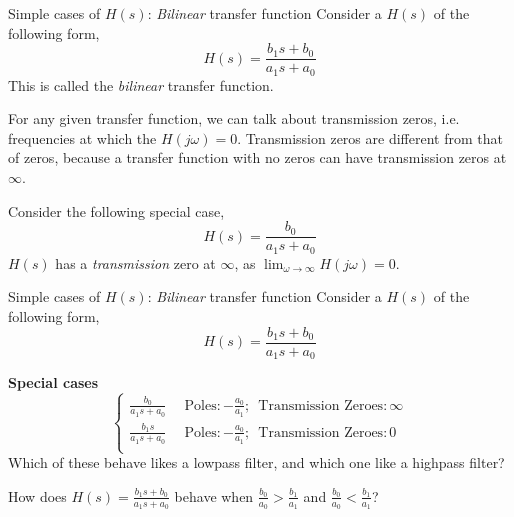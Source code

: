 \documentclass{beamer}
\begin{document}
\begin{frame}{Simple cases of $H(s)$: \textit{Bilinear} transfer function}
Consider a $H(s)$ of the following form,
\[ H(s) = \frac{b_1s + b_0}{a_1s + a_0} \]
This is called the \textit{bilinear} transfer function.\\
\vspace{2mm}

For any given transfer function, we can talk about transmission zeros, i.e. frequencies at which the $H(j\omega) = 0$. Transmission zeros are different from that of zeros, because a transfer function with no zeros can have transmission zeros at $\infty$.\\
\vspace{2mm}

Consider the following special case,
\[ H(s) = \frac{b_0}{a_1s + a_0} \]
$H(s)$ has a \textit{transmission} zero at $\infty$, as $\lim_{\omega \to \infty}H(j\omega) = 0$. 
\end{frame}

\begin{frame}{Simple cases of $H(s)$: \textit{Bilinear} transfer function}
Consider a $H(s)$ of the following form,
\[ H(s) = \frac{b_1s + b_0}{a_1s + a_0} \]

\textbf{Special cases}
\[\begin{cases}
\frac{b_0}{a_1s+a_0} & \,\,\,\text{Poles}: -\frac{a_0}{a_1};\,\,\,\text{Transmission Zeroes}: \infty \\
\frac{b_1s}{a_1s+a_0} & \,\,\,\text{Poles}: -\frac{a_0}{a_1};\,\,\,\text{Transmission Zeroes}: 0 \\
\end{cases}
\]
Which of these behave likes a lowpass filter, and which one like a highpass filter?\\
\vspace{2mm}

How does $H(s) = \frac{b_1s + b_0}{a_1s + a_0}$ behave when $\frac{b_0}{a_0} > \frac{b_1}{a_1}$ and $\frac{b_0}{a_0} < \frac{b_1}{a_1}$?
\end{frame}
\end{document}
